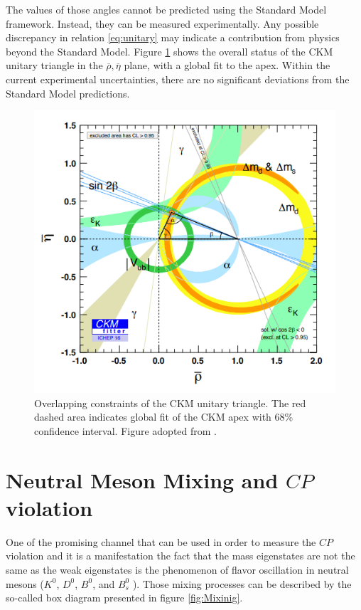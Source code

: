The values of those angles cannot be predicted using the Standard Model framework. Instead, they can be measured experimentally. Any possible discrepancy in relation \ref{eq:unitary} may indicate a contribution from physics beyond the Standard Model. Figure \ref{fig:triangle} shows the overall status of the CKM unitary triangle in the $\overline{\rho}, \overline{\eta}$ plane, with a global fit to the apex. Within the current experimental uncertainties, there are no significant deviations from the Standard Model predictions. 

\begin{figure}
\centering
\includegraphics[scale=0.6]{figures/Unitary_triangle_constrains.PNG}
\caption{Overlapping constraints of the CKM unitary triangle. The red dashed area indicates global fit of the CKM apex with 68\% confidence interval. Figure adopted from \cite{CKMFitter}.
\label{fig:triangle}}
\end{figure}


\section{Neutral Meson Mixing and $CP$ violation}

One of the promising channel that can be used in order to measure the $CP$ violation and it is a manifestation the fact that the mass eigenstates are not the same as the weak eigenstates is the phenomenon of flavor oscillation in neutral mesons ($K^0$, $D^0$, $B^0$, and $B^0_ s$ ). 
Those mixing processes can be described by the so-called box diagram presented in figure \ref{fig:Mixinig}. 


